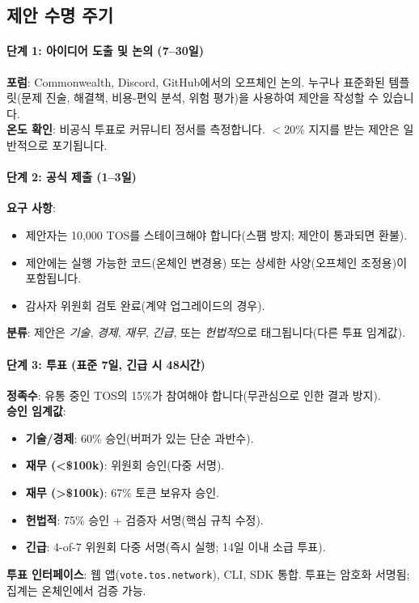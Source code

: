 \documentclass[11pt]{article}
\begin{document}
\subsection{제안 수명 주기}

\paragraph{단계 1: 아이디어 도출 및 논의 (7--30일)}
\textbf{포럼}: Commonwealth, Discord, GitHub에서의 오프체인 논의. 누구나 표준화된 템플릿(문제 진술, 해결책, 비용-편익 분석, 위험 평가)을 사용하여 제안을 작성할 수 있습니다.\\
\textbf{온도 확인}: 비공식 투표로 커뮤니티 정서를 측정합니다. $<20\%$ 지지를 받는 제안은 일반적으로 포기됩니다.

\paragraph{단계 2: 공식 제출 (1--3일)}
\textbf{요구 사항}:
\begin{itemize}[noitemsep]
  \item 제안자는 10,000 TOS를 스테이크해야 합니다(스팸 방지; 제안이 통과되면 환불).
  \item 제안에는 실행 가능한 코드(온체인 변경용) 또는 상세한 사양(오프체인 조정용)이 포함됩니다.
  \item 감사자 위원회 검토 완료(계약 업그레이드의 경우).
\end{itemize}
\textbf{분류}: 제안은 \emph{기술}, \emph{경제}, \emph{재무}, \emph{긴급}, 또는 \emph{헌법적}으로 태그됩니다(다른 투표 임계값).

\paragraph{단계 3: 투표 (표준 7일, 긴급 시 48시간)}
\textbf{정족수}: 유통 중인 TOS의 15\%가 참여해야 합니다(무관심으로 인한 결과 방지).\\
\textbf{승인 임계값}:
\begin{itemize}[noitemsep]
  \item \textbf{기술/경제}: 60\% 승인(버퍼가 있는 단순 과반수).
  \item \textbf{재무 (<\$100k)}: 위원회 승인(다중 서명).
  \item \textbf{재무 (>\$100k)}: 67\% 토큰 보유자 승인.
  \item \textbf{헌법적}: 75\% 승인 + 검증자 서명(핵심 규칙 수정).
  \item \textbf{긴급}: 4-of-7 위원회 다중 서명(즉시 실행; 14일 이내 소급 투표).
\end{itemize}
\textbf{투표 인터페이스}: 웹 앱(\texttt{vote.tos.network}), CLI, SDK 통합. 투표는 암호화 서명됨; 집계는 온체인에서 검증 가능.
\end{document}
